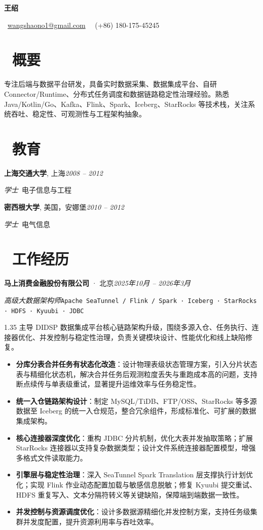 \documentclass[a4paper, 11pt]{article}
\newcommand{\name}[1]{%
  \begin{center}{\LARGE\bfseries #1}\end{center}\vspace{-4pt}%
}
\newcommand{\basicInfo}[1]{%
  \begin{center}\small #1\end{center}\vspace{2pt}%
}
\newcommand{\email}[1]{\faEnvelope~\href{mailto:#1}{#1}}
\newcommand{\phone}[1]{\faPhone~#1}
\newcommand{\datedsubsection}[2]{%
  \vspace{4pt}\noindent #1\hfill\textit{#2}\par\vspace{1pt}%
}
\newcommand{\role}[2]{%
  \noindent\textit{#1}\enspace\texttt{#2}\par%
}
\newenvironment{onehalfzspacing}{\begin{spacing}{1.35}}{\end{spacing}}
\begin{document}
\pagestyle{empty}

\name{王绍}

\basicInfo{
  \email{wangshaono1@gmail.com} \textperiodcentered\
  \phone{(+86) 180-175-45245}
}

\section{\faUser\ 概要}
专注后端与数据平台研发，具备实时数据采集、数据集成平台、自研 Connector/Runtime、分布式任务调度和数据链路稳定性治理经验。熟悉 Java/Kotlin/Go、Kafka、Flink、Spark、Iceberg、StarRocks 等技术栈，关注系统吞吐、稳定性、可观测性与工程架构抽象。

\section{\faGraduationCap\ 教育}
\datedsubsection{\textbf{上海交通大学}, 上海}{2008 -- 2012}
\textit{学士}\ 电子信息与工程

\datedsubsection{\textbf{密西根大学}, 美国，安娜堡}{2010 -- 2012}
\textit{学士}\ 电气信息

\section{\faUsers\ 工作经历}
\datedsubsection{\textbf{马上消费金融股份有限公司} · 北京}{2025年10月 -- 2026年3月}
\role{高级大数据架构师}{Apache SeaTunnel / Flink / Spark · Iceberg · StarRocks · HDFS · Kyuubi · JDBC}
\begin{onehalfzspacing}
主导 DIDSP 数据集成平台核心链路架构升级，围绕多源入仓、任务执行、连接器优化、并发控制与稳定性治理，负责关键模块设计、性能优化和线上缺陷修复。
\begin{itemize}
  \item \textbf{分库分表合并任务有状态化改造}：设计物理表级状态管理方案，引入分片状态表与精细化状态机，解决合并任务后观测粒度丢失与重跑成本高的问题，支持断点续传与单表级重试，显著提升运维效率与任务稳定性。
  \item \textbf{统一入仓链路架构设计}：制定 MySQL/TiDB、FTP/OSS、StarRocks 等多源数据至 Iceberg 的统一入仓规范，整合冗余组件，形成标准化、可扩展的数据集成架构。
  \item \textbf{核心连接器深度优化}：重构 JDBC 分片机制，优化大表并发抽取策略；扩展 StarRocks 连接器以支持复杂数据类型；设计文件系统连接器配置模型，增强多格式文件读取能力。
  \item \textbf{引擎层与稳定性治理}：深入 SeaTunnel Spark Translation 层支撑执行计划优化；实现 Flink 作业动态配置加载与敏感信息脱敏；修复 Kyuubi 提交重试、HDFS 重复写入、文本分隔符转义等关键缺陷，保障端到端数据一致性。
  \item \textbf{并发控制与资源调度优化}：设计多数据源精细化并发控制方案，支持任务级集群并发度配置，提升资源利用率与吞吐效率。
\end{itemize}
\end{onehalfzspacing}
\end{document}
